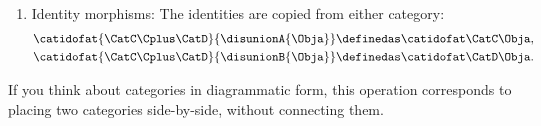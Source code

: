 \begin{ctdefinition}
\begin{enumerate}
              $$\Emptyset \to \HomSet{\CatC\Cplus\CatD}{\disunionI{\Obja}}{\disunionK{\Objc}}$$
              in all other cases.
        \item Identity morphisms: The identities  are copied from either category:
              \begin{align}
                  \catidofat{\CatC\Cplus\CatD}{\disunionA{\Obja}} & \definedas \catidofat\CatC\Obja, \\
                  \catidofat{\CatC\Cplus\CatD}{\disunionB{\Obja}} & \definedas \catidofat\CatD\Obja.
              \end{align}
    \end{enumerate}
\end{ctdefinition}

\begin{remark}
    If you think about categories in diagrammatic form, this operation corresponds to placing two categories side-by-side, without connecting them.
\end{remark}

